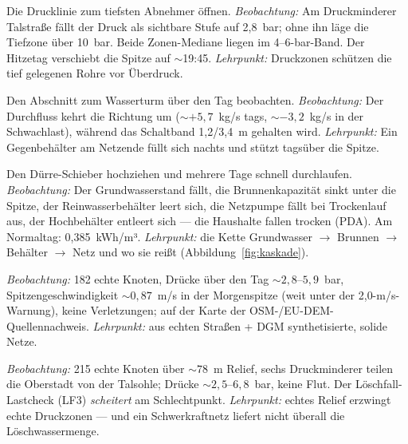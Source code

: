 \documentclass[11pt,a4paper,parskip=half]{scrreprt}
\begin{document}
\begin{beispiel}
Die Drucklinie zum tiefsten Abnehmer öffnen. \emph{Beobachtung:} Am Druckminderer
Talstraße fällt der Druck als sichtbare Stufe auf 2{,}8~bar; ohne ihn läge die
Tiefzone über 10~bar. Beide Zonen-Mediane liegen im 4--6-bar-Band. Der Hitzetag
verschiebt die Spitze auf $\sim$19:45. \emph{Lehrpunkt:} Druckzonen schützen die
tief gelegenen Rohre vor Überdruck.
\end{beispiel}

\begin{beispiel}
Den Abschnitt zum Wasserturm über den Tag beobachten. \emph{Beobachtung:} Der
Durchfluss kehrt die Richtung um ($\sim+5{,}7$~kg/s tags, $\sim-3{,}2$~kg/s in der
Schwachlast), während das Schaltband 1{,}2/3{,}4~m gehalten wird. \emph{Lehrpunkt:}
Ein Gegenbehälter am Netzende füllt sich nachts und stützt tagsüber die Spitze.
\end{beispiel}

\begin{beispiel}
Den Dürre-Schieber hochziehen und mehrere Tage schnell durchlaufen.
\emph{Beobachtung:} Der Grundwasserstand fällt, die Brunnenkapazität sinkt unter
die Spitze, der Reinwasserbehälter leert sich, die Netzpumpe fällt bei Trockenlauf
aus, der Hochbehälter entleert sich — die Haushalte fallen trocken (PDA). Am
Normaltag: 0{,}385~kWh/m³. \emph{Lehrpunkt:} die Kette Grundwasser $\to$ Brunnen
$\to$ Behälter $\to$ Netz und wo sie reißt (Abbildung~\ref{fig:kaskade}).
\end{beispiel}

\begin{beispiel}
\emph{Beobachtung:} 182 echte Knoten, Drücke über den Tag $\sim2{,}8$--$5{,}9$~bar,
Spitzengeschwindigkeit $\sim0{,}87$~m/s in der Morgenspitze (weit unter der
2{,}0-m/s-Warnung), keine Verletzungen; auf der Karte der OSM-/EU-DEM-Quellen\-nachweis.
\emph{Lehrpunkt:} aus echten Straßen + DGM synthetisierte, solide Netze.
\end{beispiel}

\begin{beispiel}
\emph{Beobachtung:} 215 echte Knoten über $\sim78$~m Relief, sechs Druckminderer
teilen die Oberstadt von der Talsohle; Drücke $\sim2{,}5$--$6{,}8$~bar, keine Flut.
Der Löschfall-Lastcheck (LF3) \emph{scheitert} am Schlechtpunkt. \emph{Lehrpunkt:}
echtes Relief erzwingt echte Druckzonen — und ein Schwerkraftnetz liefert nicht
überall die Löschwassermenge.
\end{beispiel}
\end{document}
